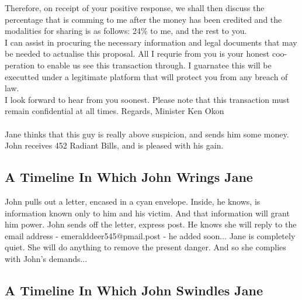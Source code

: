 \documentclass{article}
\begin{document}
Therefore, on receipt of your positive response, we shall then discuss the percentage that is comming to me after the money has been credited and the modalities for sharing is as follows: 24\% to me, and the rest to you.
\\
I can assist in procuring the necessary information and legal documents that may be needed to actualise this proposal.
All I requrie from you is your honest coo{-}peration to enable us see this transaction through.
I guarnatee this will be executted under a legitimate platform that will protect you from any breach of law.
\\
I look forward to hear from you soonest.
Please note that this transaction must remain confidential at all times.
Regards, Minister Ken Okon
\\\\
Jane thinks that this guy is really above suspicion, and sends him some money.
John receives 452 Radiant Bills, and is pleased with his gain.
\subsection{A Timeline In Which John Wrings Jane}


John pulls out a letter, encased in a cyan envelope. Inside, he knows, is information known only to him and his victim. And that information will grant him power.
John sends off the letter, express post. He knows she will reply to the email address {-} emeralddeer545@pmail.post {-} he added soon...
Jane is completely quiet. She will do anything to remove the present danger. And so she complies with John's demands...
\subsection{A Timeline In Which John Swindles Jane}
\end{document}
